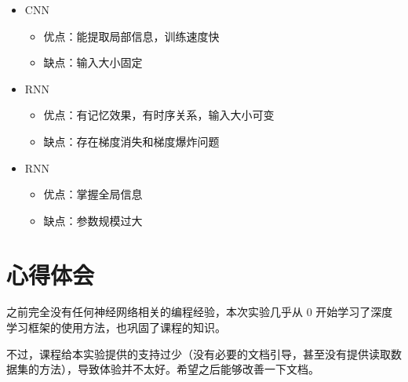 \documentclass[a4paper]{article}
\begin{document}
\begin{itemize}
    \item CNN \begin{itemize}
        \item 优点：能提取局部信息，训练速度快
        \item 缺点：输入大小固定
    \end{itemize}
    \item RNN \begin{itemize}
        \item 优点：有记忆效果，有时序关系，输入大小可变
        \item 缺点：存在梯度消失和梯度爆炸问题
    \end{itemize}
    \item RNN \begin{itemize}
        \item 优点：掌握全局信息
        \item 缺点：参数规模过大
    \end{itemize}
\end{itemize}

\section{心得体会}

之前完全没有任何神经网络相关的编程经验，本次实验几乎从 0 开始学习了深度学习框架的使用方法，也巩固了课程的知识。

不过，课程给本实验提供的支持过少（没有必要的文档引导，甚至没有提供读取数据集的方法），导致体验并不太好。希望之后能够改善一下文档。
\end{document}
